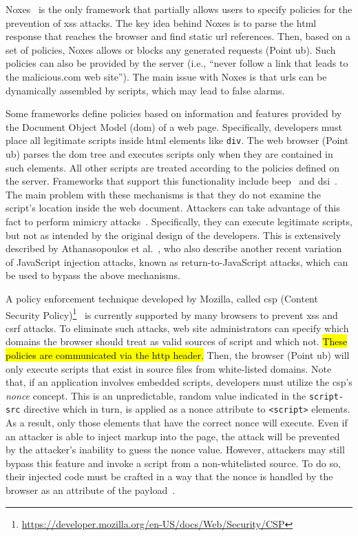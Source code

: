 \documentclass[10pt,journal,compsoc]{IEEEtran}
\newcommand{\hlc}[2][yellow]{ {\sethlcolor{#1} \hl{#2}} }
\begin{document}
Noxes~\cite{KJKV09} is the only
framework that partially allows
users to specify policies for the prevention of {\sc xss} attacks.
The key idea behind Noxes is to parse
the {\sc html} response that reaches the browser and
find static {\sc url} references. Then, based on
a set of policies, Noxes allows or blocks
any generated requests (Point {\sc ub}). Such policies
can also be provided by the server (i.e., ``never
follow a link that leads to the malicious.com
web site''). The main issue with Noxes is that
{\sc url}s can be dynamically assembled by scripts,
which may lead to false alarms.

Some frameworks define policies based on information and
features provided by the Document Object Model ({\sc dom}) of a web
page. Specifically, developers must place all legitimate scripts
inside {\sc html} elements like {\tt div}. The web browser (Point {\sc
  ub}) parses the {\sc dom} tree and executes scripts only when they
are contained in such elements. All other scripts are treated
according to the policies defined on the server. Frameworks that
support this functionality include {\sc beep}~\cite{TNH07} and {\sc
  dsi}~\cite{NSS06}. The main problem with these mechanisms is that
they do not examine the script's location inside the web document.
Attackers can take advantage of this fact to perform mimicry attacks~\cite{WS02}.
Specifically, they can execute legitimate scripts, but not as intended
by the original design of the developers. This is extensively
described by Athanasopoulos et al.~\cite{APKLM10}, who also describe
another recent variation of JavaScript injection attacks, known as
return-to-JavaScript attacks, which can be used to bypass the above
mechanisms.
\vspace{-0.5mm}

A policy enforcement technique developed by Mozilla,
called {\sc csp} (Content Security
Policy)\footnote{\scriptsize\url{https://developer.mozilla.org/en-US/docs/Web/Security/CSP}}~\cite{SSM10}
is currently supported by many browsers to prevent
{\sc xss} and {\sc csrf} attacks. To eliminate such
attacks, web site administrators
can specify which domains the browser should treat
as valid sources of script and which not.
\hlc[yellow]{These policies are communicated via the {\sc http} header.}
Then, the browser
(Point {\sc ub}) will only execute scripts that exist in
source files from white-listed domains.
Note that,
if an application involves
embedded scripts, developers must utilize
the {\sc csp}'s {\em nonce} concept.
This is an unpredictable,
random value indicated in
the {\tt script-src} directive which in turn,
is applied as a nonce attribute to
{\tt <script>} elements.
As a result, only those elements that have the
correct nonce will execute.
Even if an attacker
is able to inject markup into the page,
the attack will be prevented by the attacker's
inability to guess the nonce value.
However, attackers may still bypass this feature
and invoke a script from a non-whitelisted source.
To do so, their injected code must
be crafted in a way that the nonce is handled
by the browser as an attribute of the payload~\cite{jigsaw}.
\vspace{-0.5mm}
\end{document}
